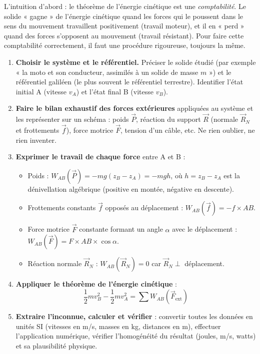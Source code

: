 \documentclass[11pt]{article}
\begin{document}
L'intuition d'abord : le théorème de l'énergie cinétique est une \emph{comptabilité}. Le solide « gagne » de l'énergie cinétique quand les forces qui le poussent dans le sens du mouvement travaillent positivement (travail moteur), et il en « perd » quand des forces s'opposent au mouvement (travail résistant). Pour faire cette comptabilité correctement, il faut une procédure rigoureuse, toujours la même.

\begin{methode}
\begin{enumerate}
\item \textbf{Choisir le système et le référentiel.} Préciser le solide étudié (par exemple « la moto et son conducteur, assimilés à un solide de masse $m$ ») et le référentiel galiléen (le plus souvent le référentiel terrestre). Identifier l'état initial A (vitesse $v_A$) et l'état final B (vitesse $v_B$).
\item \textbf{Faire le bilan exhaustif des forces extérieures} appliquées au système et les représenter sur un schéma : poids $\vec{P}$, réaction du support $\vec{R}$ (normale $\vec{R}_N$ et frottements $\vec{f}$), force motrice $\vec{F}$, tension d'un câble, etc. Ne rien oublier, ne rien inventer.
\item \textbf{Exprimer le travail de chaque force} entre A et B :
      \begin{itemize}
      \item Poids : $W_{AB}(\vec{P}) = -mg(z_B - z_A) = -mgh$, où $h = z_B - z_A$ est la dénivellation algébrique (positive en montée, négative en descente).
      \item Frottements constants $\vec{f}$ opposés au déplacement : $W_{AB}(\vec{f}) = -f \times AB$.
      \item Force motrice $\vec{F}$ constante formant un angle $\alpha$ avec le déplacement : $W_{AB}(\vec{F}) = F \times AB \times \cos\alpha$.
      \item Réaction normale $\vec{R}_N$ : $W_{AB}(\vec{R}_N) = 0$ car $\vec{R}_N \perp$ déplacement.
      \end{itemize}
\item \textbf{Appliquer le théorème de l'énergie cinétique} :
\[ \frac{1}{2}mv_B^2 - \frac{1}{2}mv_A^2 = \sum W_{AB}(\vec{F}_{\text{ext}}) \]
\item \textbf{Extraire l'inconnue, calculer et vérifier} : convertir toutes les données en unités SI (vitesses en m/s, masses en kg, distances en m), effectuer l'application numérique, vérifier l'homogénéité du résultat (joules, m/s, watts) et sa plausibilité physique.
\end{enumerate}
\end{methode}
\end{document}

